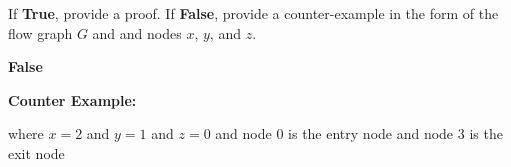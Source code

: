 \documentclass[12pt]{article}
\begin{document}
\begin{enumerate}
\begin{enumerate}
        If \textbf{True}, provide a proof. If \textbf{False}, provide a
        counter-example in the form of the flow graph $G$ and and nodes $x$,
        $y$, and $z$.
        \begin{mdframed}
          \textbf{False}

          \textbf{Counter Example:}
          \begin{mdframed}
          where $x = 2$ and $y = 1$ and $z = 0$ and node $0$ is the entry node and node $3$ is the exit node
          \end{mdframed}
        \end{mdframed}
      \end{enumerate}
      
    \end{enumerate}
    
    
\end{document}
